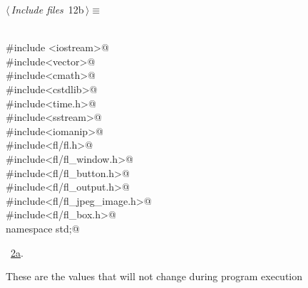 \documentclass{article}
\renewcommand{\NWtarget}[2]{\hypertarget{#1}{#2}}
\renewcommand{\NWlink}[2]{\hyperlink{#1}{#2}}
\begin{document}
\begin{flushleft} \small
\begin{minipage}{\linewidth}\label{scrap18}\raggedright\small
\NWtarget{nuweb12b}{} $\langle\,${\it Include files}\nobreak\ {\footnotesize {12b}}$\,\rangle\equiv$
\vspace{-1ex}
\begin{list}{}{} \item
\mbox{}\verb@@\\
\mbox{}\verb@#include <iostream>@\\
\mbox{}\verb@#include<vector>@\\
\mbox{}\verb@#include<cmath>@\\
\mbox{}\verb@#include<cstdlib>@\\
\mbox{}\verb@#include<time.h>@\\
\mbox{}\verb@#include<sstream>@\\
\mbox{}\verb@#include<iomanip>@\\
\mbox{}\verb@#include<fl/fl.h>@\\
\mbox{}\verb@#include<fl/fl_window.h>@\\
\mbox{}\verb@#include<fl/fl_button.h>@\\
\mbox{}\verb@#include<fl/fl_output.h>@\\
\mbox{}\verb@#include<fl/fl_jpeg_image.h>@\\
\mbox{}\verb@#include<fl/fl_box.h>@\\
\mbox{}\verb@using namespace std;@\\
\mbox{}\verb@@{\NWsep}
\end{list}
\vspace{-1.5ex}
\footnotesize
\begin{list}{}{\setlength{\itemsep}{-\parsep}\setlength{\itemindent}{-\leftmargin}}
\item \NWtxtMacroRefIn\ \NWlink{nuweb2a}{2a}.

\item{}
\end{list}
\end{minipage}\vspace{4ex}
\end{flushleft}
These are the values that will not change during program execution
\end{document}
